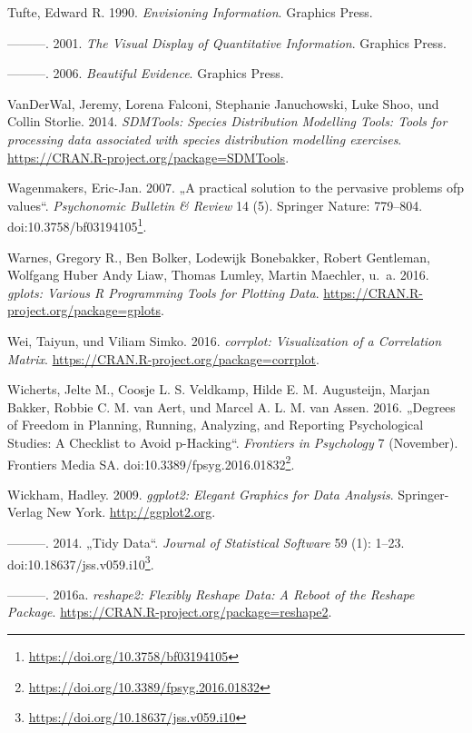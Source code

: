 \documentclass[12pt,ngerman,]{book}
\let\rmarkdownfootnote\footnote%
\def\footnote{\protect\rmarkdownfootnote}
\renewcommand{\href}[2]{#2\footnote{\url{#1}}}
\begin{document}
\hypertarget{ref-1930824149}{}
Tufte, Edward R. 1990. \emph{Envisioning Information}. Graphics Press.

\hypertarget{ref-1930824130}{}
---------. 2001. \emph{The Visual Display of Quantitative Information}.
Graphics Press.

\hypertarget{ref-1930824165}{}
---------. 2006. \emph{Beautiful Evidence}. Graphics Press.

\hypertarget{ref-R-SDMTools}{}
VanDerWal, Jeremy, Lorena Falconi, Stephanie Januchowski, Luke Shoo, und
Collin Storlie. 2014. \emph{SDMTools: Species Distribution Modelling
Tools: Tools for processing data associated with species distribution
modelling exercises}. \url{https://CRAN.R-project.org/package=SDMTools}.

\hypertarget{ref-Wagenmakers2007}{}
Wagenmakers, Eric-Jan. 2007. „A practical solution to the pervasive
problems ofp values``. \emph{Psychonomic Bulletin \& Review} 14 (5).
Springer Nature: 779--804.
doi:\href{https://doi.org/10.3758/bf03194105}{10.3758/bf03194105}.

\hypertarget{ref-R-gplots}{}
Warnes, Gregory R., Ben Bolker, Lodewijk Bonebakker, Robert Gentleman,
Wolfgang Huber Andy Liaw, Thomas Lumley, Martin Maechler, u.~a. 2016.
\emph{gplots: Various R Programming Tools for Plotting Data}.
\url{https://CRAN.R-project.org/package=gplots}.

\hypertarget{ref-R-corrplot}{}
Wei, Taiyun, und Viliam Simko. 2016. \emph{corrplot: Visualization of a
Correlation Matrix}. \url{https://CRAN.R-project.org/package=corrplot}.

\hypertarget{ref-Wicherts2016}{}
Wicherts, Jelte M., Coosje L. S. Veldkamp, Hilde E. M. Augusteijn,
Marjan Bakker, Robbie C. M. van Aert, und Marcel A. L. M. van Assen.
2016. „Degrees of Freedom in Planning, Running, Analyzing, and Reporting
Psychological Studies: A Checklist to Avoid p-Hacking``. \emph{Frontiers
in Psychology} 7 (November). Frontiers Media SA.
doi:\href{https://doi.org/10.3389/fpsyg.2016.01832}{10.3389/fpsyg.2016.01832}.

\hypertarget{ref-R-ggplot2}{}
Wickham, Hadley. 2009. \emph{ggplot2: Elegant Graphics for Data
Analysis}. Springer-Verlag New York. \url{http://ggplot2.org}.

\hypertarget{ref-tidydata}{}
---------. 2014. „Tidy Data``. \emph{Journal of Statistical Software} 59
(1): 1--23.
doi:\href{https://doi.org/10.18637/jss.v059.i10}{10.18637/jss.v059.i10}.

\hypertarget{ref-R-reshape2}{}
---------. 2016a. \emph{reshape2: Flexibly Reshape Data: A Reboot of the
Reshape Package}. \url{https://CRAN.R-project.org/package=reshape2}.
\end{document}
